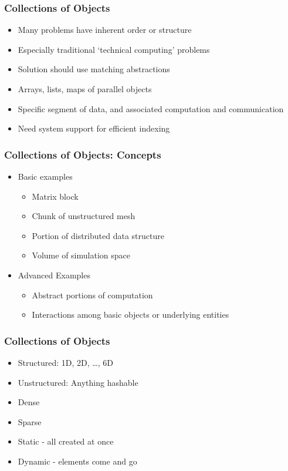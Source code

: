 
\begin{frame}[fragile]
  \frametitle{Collections of Objects}
  \begin{itemize}
    \item Many problems have inherent order or structure
    \item Especially traditional `technical computing' problems
    \item Solution should use matching abstractions
    \item Arrays, lists, maps of parallel objects
    \item Specific segment of data, and associated computation and
      communication
    \item Need system support for efficient indexing
  \end{itemize}
\end{frame}

\begin{frame}[fragile]
  \frametitle{Collections of Objects: Concepts}
  \begin{itemize}
    \item Basic examples
      \begin{itemize}
      \item Matrix block
      \item Chunk of unstructured mesh
      \item Portion of distributed data structure
      \item Volume of simulation space
      \end{itemize}
      \pause
    \item Advanced Examples
      \begin{itemize}
      \item Abstract portions of computation
      \item Interactions among basic objects or underlying entities
      \end{itemize}
  \end{itemize}
\end{frame}

\begin{frame}[fragile]
  \frametitle{Collections of Objects}
  \begin{itemize}
    \item Structured: 1D, 2D, \ldots, 6D
    \item Unstructured: Anything hashable
      \pause
    \item Dense
    \item Sparse
      \pause
    \item Static - all created at once
    \item Dynamic - elements come and go
  \end{itemize}
\end{frame}

